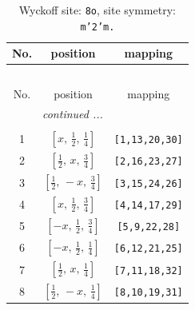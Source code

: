 \documentclass[fleqn,8pt]{jsarticle}
\begin{document}
\begin{longtable}{ccc}
\caption{Wyckoff site: {\tt 8o}, site symmetry: {\tt m'2'm.}}
 \\
 \hline \hline
No. & position & mapping \\ \hline \endfirsthead

\multicolumn{2}{l}{\tablename\ \thetable{}} \\
 \hline \hline
No. & position & mapping \\ \hline \endhead

 \hline \hline
\multicolumn{2}{r}{\footnotesize\it continued ...} \\ \endfoot

 \hline \hline
\multicolumn{2}{r}{} \\ \endlastfoot

1 & $\left[ x,\, \frac{1}{2},\, \frac{1}{4} \right]$ & {\tt [1,13,20,30]} \\ \hline
2 & $\left[ \frac{1}{2},\, x,\, \frac{3}{4} \right]$ & {\tt [2,16,23,27]} \\ \hline
3 & $\left[ \frac{1}{2},\, - x,\, \frac{3}{4} \right]$ & {\tt [3,15,24,26]} \\ \hline
4 & $\left[ x,\, \frac{1}{2},\, \frac{3}{4} \right]$ & {\tt [4,14,17,29]} \\ \hline
5 & $\left[ - x,\, \frac{1}{2},\, \frac{3}{4} \right]$ & {\tt [5,9,22,28]} \\ \hline
6 & $\left[ - x,\, \frac{1}{2},\, \frac{1}{4} \right]$ & {\tt [6,12,21,25]} \\ \hline
7 & $\left[ \frac{1}{2},\, x,\, \frac{1}{4} \right]$ & {\tt [7,11,18,32]} \\ \hline
8 & $\left[ \frac{1}{2},\, - x,\, \frac{1}{4} \right]$ & {\tt [8,10,19,31]} \\
\end{longtable}
\renewcommand{\arraystretch}{1.2}
\end{document}
